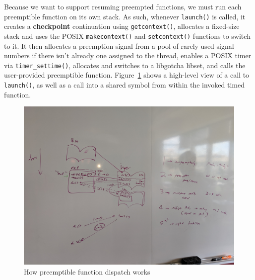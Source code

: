 
Because we want to support resuming preempted functions, we must run each preemptible
function on its own stack.  As such, whenever \texttt{launch()} is called, it creates
a \textbf{checkpoint} continuation using \texttt{getcontext()}, allocates a
fixed-size stack and uses the POSIX \texttt{makecontext()} and \texttt{setcontext()}
functions to switch to it.  It then allocates a preemption signal from a pool of
rarely-used signal numbers if there isn't already one assigned to the thread,
enables a POSIX timer via \texttt{timer\_settime()}, allocates and switches to a
libgotcha libset, and calls the user-provided preemptible function.
Figure~\ref{fig:dispatch} shows a high-level view of a call to \texttt{launch()}, as
well as a call into a shared symbol from within the invoked timed function.

\begin{figure}
\includegraphics[width=\columnwidth]{figs/calltree}
\caption{How preemptible function dispatch works}
\label{fig:dispatch}
\end{figure}

